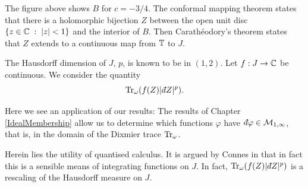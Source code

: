 The figure above shows $B$ for $c = -3/4$.
The conformal mapping theorem states that there is a holomorphic
bijection $Z$ between the open unit disc $\{z \in \mathbb{C}\;:\;|z| < 1\}$
and the interior of $B$. Then Carath\'eodory's theorem
 states that $Z$ extends to a continuous
map from $\mathbb{T}$ to $J$. 

The Hausdorff dimension of $J$, $p$, is known to be in $(1,2)$. Let
$f:J\to\mathbb{C}$ be continuous. We consider the quantity
\begin{equation}
    \Tr_\omega(f(Z)|\qd Z|^p).
\end{equation}


Here we see an application of our results: The results of Chapter \ref{IdealMembership}
allow us to determine which functions $\varphi$ have $\qd \varphi\in \M_{1,\infty}$,
that is, in the domain of the Dixmier trace $\operatorname{Tr}_\omega$.

Herein lies the utility
of quantised calculus.
It is argued by Connes in \cite{Connes94} that in fact this is a sensible
means of integrating functions on $J$. In fact, $\Tr_\omega(f(Z)|\qd Z|^p)$
is a rescaling of the Hausdorff measure on $J$.

